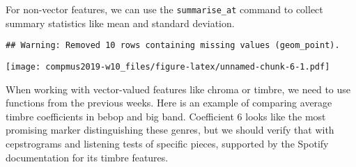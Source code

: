 \documentclass[]{article}
\newenvironment{Shaded}{\begin{snugshade}}{\end{snugshade}}
\newcommand{\DataTypeTok}[1]{\textcolor[rgb]{0.13,0.29,0.53}{#1}}
\newcommand{\DecValTok}[1]{\textcolor[rgb]{0.00,0.00,0.81}{#1}}
\newcommand{\KeywordTok}[1]{\textcolor[rgb]{0.13,0.29,0.53}{\textbf{#1}}}
\newcommand{\NormalTok}[1]{#1}
\newcommand{\OperatorTok}[1]{\textcolor[rgb]{0.81,0.36,0.00}{\textbf{#1}}}
\newcommand{\StringTok}[1]{\textcolor[rgb]{0.31,0.60,0.02}{#1}}
\begin{document}
For non-vector features, we can use the \texttt{summarise\_at} command
to collect summary statistics like mean and standard deviation.

\begin{Shaded}
\end{Shaded}

\begin{verbatim}
## Warning: Removed 10 rows containing missing values (geom_point).
\end{verbatim}

\texttt{[image: compmus2019-w10\_files/figure-latex/unnamed-chunk-6-1.pdf]}

When working with vector-valued features like chroma or timbre, we need
to use functions from the previous weeks. Here is an example of
comparing average timbre coefficients in bebop and big band. Coefficient
6 looks like the most promising marker distinguishing these genres, but
we should verify that with cepstrograms and listening tests of specific
pieces, supported by the Spotify documentation for its timbre features.
\end{document}
